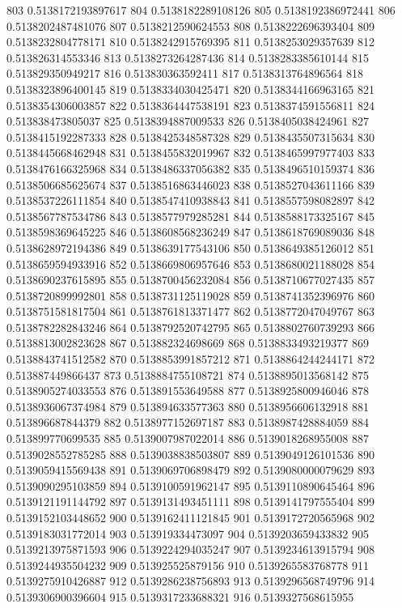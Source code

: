 803 0.5138172193897617
804 0.5138182289108126
805 0.5138192386972441
806 0.5138202487481076
807 0.5138212590624553
808 0.5138222696393404
809 0.5138232804778171
810 0.5138242915769395
811 0.5138253029357639
812 0.513826314553346
813 0.5138273264287436
814 0.5138283385610144
815 0.513829350949217
816 0.513830363592411
817 0.5138313764896564
818 0.5138323896400145
819 0.5138334030425471
820 0.5138344166963165
821 0.5138354306003857
822 0.5138364447538191
823 0.5138374591556811
824 0.513838473805037
825 0.5138394887009533
826 0.5138405038424961
827 0.5138415192287333
828 0.5138425348587328
829 0.5138435507315634
830 0.5138445668462948
831 0.5138455832019967
832 0.5138465997977403
833 0.5138476166325968
834 0.5138486337056382
835 0.5138496510159374
836 0.5138506685625674
837 0.5138516863446023
838 0.5138527043611166
839 0.5138537226111854
840 0.5138547410938843
841 0.5138557598082897
842 0.5138567787534786
843 0.5138577979285281
844 0.5138588173325167
845 0.5138598369645225
846 0.5138608568236249
847 0.5138618769089036
848 0.5138628972194386
849 0.5138639177543106
850 0.5138649385126012
851 0.5138659594933916
852 0.5138669806957646
853 0.5138680021188028
854 0.5138690237615895
855 0.5138700456232084
856 0.5138710677027435
857 0.5138720899992801
858 0.5138731125119028
859 0.5138741352396976
860 0.5138751581817504
861 0.5138761813371477
862 0.5138772047049767
863 0.5138782282843246
864 0.5138792520742795
865 0.5138802760739293
866 0.5138813002823628
867 0.513882324698669
868 0.5138833493219377
869 0.5138843741512582
870 0.5138853991857212
871 0.5138864244244171
872 0.513887449866437
873 0.5138884755108721
874 0.5138895013568142
875 0.5138905274033553
876 0.513891553649588
877 0.5138925800946046
878 0.5138936067374984
879 0.513894633577363
880 0.5138956606132918
881 0.513896687844379
882 0.5138977152697187
883 0.5138987428884059
884 0.513899770699535
885 0.5139007987022014
886 0.5139018268955008
887 0.5139028552785285
888 0.5139038838503807
889 0.5139049126101536
890 0.5139059415569438
891 0.5139069706898479
892 0.5139080000079629
893 0.5139090295103859
894 0.5139100591962147
895 0.5139110890645464
896 0.5139121191144792
897 0.5139131493451111
898 0.5139141797555404
899 0.5139152103448652
900 0.5139162411121845
901 0.5139172720565968
902 0.5139183031772014
903 0.513919334473097
904 0.5139203659433832
905 0.5139213975871593
906 0.5139224294035247
907 0.5139234613915794
908 0.5139244935504232
909 0.513925525879156
910 0.5139265583768778
911 0.5139275910426887
912 0.5139286238756893
913 0.5139296568749796
914 0.5139306900396604
915 0.5139317233688321
916 0.5139327568615955

